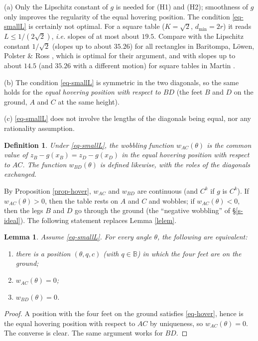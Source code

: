 \documentclass[a4paper,11pt,twoside,leqno]{article}
\newtheorem{lem}[teo]{Lemma}
\newtheorem{dfn}[teo]{Definition}
\newcommand{\ie}[0]{\emph{i.e.} }
\numberwithin{equation}{section}
\begin{document}
\begin{rmk}
(a) Only the Lipschitz constant of $g$ is needed for (H1) and (H2); smoothness of $g$ only improves the regularity of the equal hovering position. The condition \eqref{eq-smallL} is certainly not optimal. For a square table ($K = \sqrt{2}$, $d_{\min} = 2r$) it reads $L \leq 1/(2\sqrt{2})$, \ie slopes of at most about $19.5$\textdegree{}. Compare with the Lipschitz constant $1/\sqrt{2}$ (slopes up to about $35.26$\textdegree{}) for all rectangles in Baritompa, L\"owen, Polster \& Ross \cite[Theorem 2]{BLPR}, which is optimal for their argument, and with slopes up to about $14.5$\textdegree{} (and $35.26$\textdegree{} with a different motion) for square tables in Martin \cite[\S{}3]{Mar}.

(b) The condition \eqref{eq-smallL} is symmetric in the two diagonals, so the same holds for the \emph{equal hovering position with respect to $BD$} (the feet $B$ and $D$ on the ground, $A$ and $C$ at the same height).

(c) \eqref{eq-smallL} does not involve the lengths of the diagonals being equal, nor any rationality assumption.
\end{rmk}

\begin{dfn}
Under \eqref{eq-smallL}, the \emph{wobbling function} $w_{AC}(\theta)$ is the common value of $z_B - g(x_B) = z_D - g(x_D)$ in the equal hovering position with respect to $AC$. The function $w_{BD}(\theta)$ is defined likewise, with the roles of the diagonals exchanged.
\end{dfn}

By Proposition \ref{prop-hover}, $w_{AC}$ and $w_{BD}$ are continuous (and $C^k$ if $g$ is $C^k$). If $w_{AC}(\theta) > 0$, then the table rests on $A$ and $C$ and wobbles; if $w_{AC}(\theta) <0$, then the legs $B$ and $D$ go through the ground (the ``negative wobbling'' of \S{}\ref{s-ideal}). The following statement replaces Lemma \ref{lelem}.

\begin{lem}\label{lem-wobble}
Assume \eqref{eq-smallL}. For every angle $\theta$, the following are equivalent:
\begin{enumerate}\renewcommand{\theenumi}{\bfseries (\alph{enumi})}
 \item there is a position $(\theta,q,c)$ (with $q \in \mathbb{B}$) in which the four feet are on the ground;
 \item $w_{AC}(\theta) = 0$;
 \item $w_{BD}(\theta) = 0$.
\end{enumerate}
\end{lem}
\begin{proof}
A position with the four feet on the ground satisfies \eqref{eq-hover}, hence is the equal hovering position with respect to $AC$ by uniqueness, so $w_{AC}(\theta)=0$. The converse is clear. The same argument works for $BD$.
\end{proof}
\end{document}
